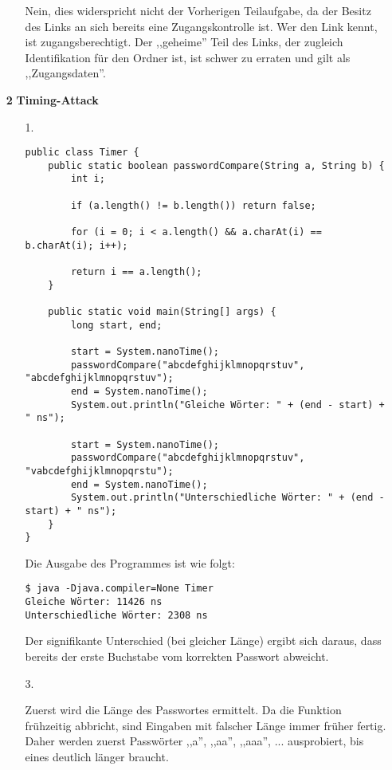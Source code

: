 \documentclass[a4paper,11pt]{article}
\begin{document}
\begin{enumerate}
\begin{enumerate}
            Nein, dies widerspricht nicht der Vorherigen Teilaufgabe, da der Besitz des Links an sich bereits eine Zugangskontrolle ist. Wer den Link kennt, ist zugangsberechtigt. Der ,,geheime'' Teil des Links, der zugleich Identifikation für den Ordner ist, ist schwer zu erraten und gilt als ,,Zugangsdaten''.



    \end{enumerate}

\item[\textbf{2}]
    \textbf{Timing-Attack}

    \begin{enumerate}
        \item[1.]
            \begin{verbatim}public class Timer {
    public static boolean passwordCompare(String a, String b) {
        int i;

        if (a.length() != b.length()) return false;

        for (i = 0; i < a.length() && a.charAt(i) == b.charAt(i); i++);

        return i == a.length();
    }

    public static void main(String[] args) {
        long start, end;

        start = System.nanoTime();
        passwordCompare("abcdefghijklmnopqrstuv", "abcdefghijklmnopqrstuv");
        end = System.nanoTime();
        System.out.println("Gleiche Wörter: " + (end - start) + " ns");

        start = System.nanoTime();
        passwordCompare("abcdefghijklmnopqrstuv", "vabcdefghijklmnopqrstu");
        end = System.nanoTime();
        System.out.println("Unterschiedliche Wörter: " + (end - start) + " ns");
    }
}\end{verbatim}

            Die Ausgabe des Programmes ist wie folgt:

            \begin{verbatim}$ java -Djava.compiler=None Timer
Gleiche Wörter: 11426 ns
Unterschiedliche Wörter: 2308 ns\end{verbatim}

            Der signifikante Unterschied (bei gleicher Länge) ergibt sich daraus,
            dass bereits der erste Buchstabe vom korrekten Passwort abweicht.

        \item[3.]

            Zuerst wird die Länge des Passwortes ermittelt. Da die Funktion frühzeitig abbricht, sind Eingaben mit falscher Länge immer früher fertig. Daher werden zuerst Passwörter ,,a'', ,,aa'', ,,aaa'', ... ausprobiert, bis eines deutlich länger braucht.


\end{enumerate}
\end{enumerate}
\end{document}
